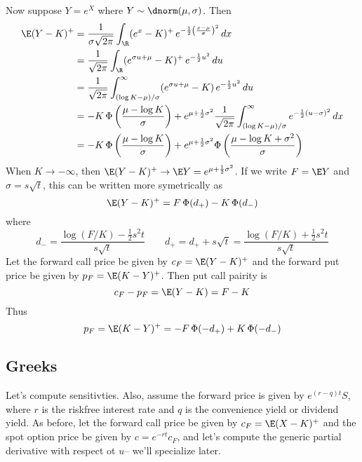 \documentclass[english,seminar]{pnotes}
\begin{document}
Now suppose $Y=e^{X}$ where $Y\sim \dnorm(\mu,\sigma)$.  Then
\begin{equation}
\begin{split}
	 \E (Y-K)^+ &=\frac 1 {\sigma \sqrt{2 \pi}} \int_{\R} (e^x - K)^+ \, e^{-\frac 1 2 \left(\frac{x-\mu}{\sigma}\right)^2}\, dx\\
	 &= \frac 1 {\sqrt{2 \pi}} \int_{\R} (e^{\sigma u + \mu} - K)^+ \, e^{-\frac 1 2 u^2}\, du\\
	 &= \frac 1 {\sqrt{2 \pi}} \int_{(\log K-\mu)/\sigma}^\infty (e^{\sigma u + \mu}-K) \,e^{-\frac 1 2 u^2}\, du\\
	 &= -K \, \Phi\left(\frac{\mu - \log K} \sigma \right) + e^{\mu + \frac 1 2 \sigma^2} \frac 1 {\sqrt{2 \pi}}  \int_{(\log K-\mu)/\sigma}^\infty e^{-\frac 1 2 (u-\sigma)^2}\, dx \\
	 &= -K \, \Phi\left(\frac{\mu - \log K} \sigma \right) + e^{\mu+\frac 1 2 \sigma^2} \Phi\left( \frac{\mu - \log K  + \sigma^2} \sigma \right)
 \end{split}
\end{equation}
When $K \to -\infty$, then $\E(Y-K)^+ \to \E Y = e^{\mu + \frac 1 2 \sigma^2}$.  If we write $F= \E Y$ and $\sigma = s \sqrt t$, this can be written more symetrically as
\begin{equation}
	\E(Y-K)^+ = F \, \Phi(d_+) -K \, \Phi( d_- ) \label{eq:black scholes}
\end{equation}
where
\begin{equation}
	d_- = \frac{\log(F/K) -\frac 1 2 s^2 t}{s\sqrt t} \qquad  d_+ = d_+ + s \sqrt t  = \frac{\log(F/K) +\frac 1 2 s^2 t}{s \sqrt t}	
\end{equation}
Let the forward call price be given by $c_F = \E(Y-K)^+$ and the forward put price be given by $p_F = \E(K-Y)^+$.  Then put call pairity is
\begin{equation}
	c_F - p_F = \E(Y-K) = F-K
\end{equation}
Thus
\begin{equation}
	p_F = \E(K-Y)^{+} = -F\,\Phi(-d_+) + K \, \Phi(-d_-)
\end{equation}

\subsection{Greeks}

Let's compute sensitivties.  Also, assume the forward price is given by $e^{(r-q)t}S$, where $r$ is the riskfree interest rate and $q$ is the convenience yield or dividend yield.  As before, let the forward call price be given by $c_F = \E(X-K)^+$  and the spot option price be given by $c = e^{-rt} c_F$, and let's compute the generic partial derivative with respect ot $u$-- we'll specialize later.  
\end{document}
